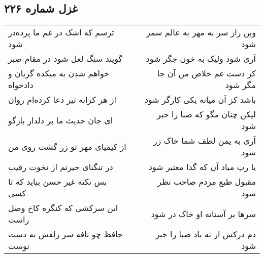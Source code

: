 \begin{center}
\section*{غزل شماره ۲۲۶}
\label{sec:sh226}
\begin{longtable}{l p{0.5cm} r}
ترسم که اشک در غم ما پرده‌در شود
&&
وین راز سر به مهر به عالم سمر شود
\\
گویند سنگ لعل شود در مقام صبر
&&
آری شود ولیک به خون جگر شود
\\
خواهم شدن به میکده گریان و دادخواه
&&
کز دست غم خلاص من آن جا مگر شود
\\
از هر کرانه تیر دعا کرده‌ام روان
&&
باشد کز آن میانه یکی کارگر شود
\\
ای جان حدیث ما بر دلدار بازگو
&&
لیکن چنان مگو که صبا را خبر شود
\\
از کیمیای مهر تو زر گشت روی من
&&
آری به یمن لطف شما خاک زر شود
\\
در تنگنای حیرتم از نخوت رقیب
&&
یا رب مباد آن که گدا معتبر شود
\\
بس نکته غیر حسن بباید که تا کسی
&&
مقبول طبع مردم صاحب نظر شود
\\
این سرکشی که کنگره کاخ وصل راست
&&
سرها بر آستانه او خاک در شود
\\
حافظ چو نافه سر زلفش به دست توست
&&
دم درکش ار نه باد صبا را خبر شود
\\
\end{longtable}
\end{center}
